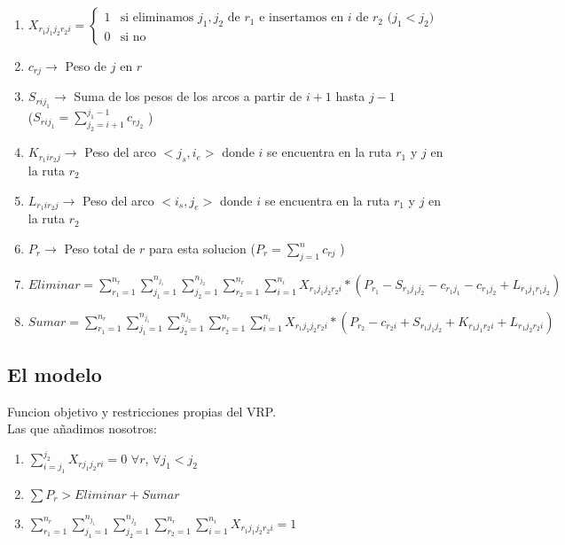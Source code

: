 \documentclass{article}
\begin{document}
\begin{enumerate}
\item
$
 X_{r_1 j_1 j_2 r_2 i}= 
\begin{cases}  
    1 & \text{si eliminamos $j_1,j_2$ de $r_1$ e insertamos en $i$ de $r_2$ ($j_1< j_2$) }\\
    0 & \text{si no } 
\end{cases}
$
\item{$c_{rj}\rightarrow$ Peso de $j$ en $r$}

\item{$S_{rij_1}\rightarrow$ Suma de los pesos de los arcos a partir de $i+1$ hasta $j-1$}\\
($S_{rij_1}=\sum\limits_{j_2=i+1}^{j_1-1} c_{rj_2}$ )

\item{$K_{r_1ir_2j}\rightarrow$ Peso del arco $<j_s,i_e>$ donde $i$ se encuentra en la ruta $r_1$ y $j$ en la ruta $r_2$}

\item{$L_{r_1ir_2j}\rightarrow$ Peso del arco $<i_s,j_e>$ donde $i$ se encuentra en la ruta $r_1$ y $j$ en la ruta $r_2$}

\item{$P_r\rightarrow$ Peso total de $r$ para esta solucion ($P_r=\sum\limits_{j=1}^{n} c_{rj}$ ) }

\item{$Eliminar=\sum\limits_{r_1=1}^{n_{r}} \sum\limits_{j_1=1}^{n_{j_1}}\sum\limits_{j_2=1}^{n_{j_2}}\sum\limits_{r_2=1}^{n_{r}}\sum\limits_{i=1}^{n_i} X_{{r_1}{j_1}{j_2}{r_2}{i}}*(P_{r_1}-S_{{r_1}{j_1}{j_2}}-c_{{r_1}{j_1}}-c_{{r_1}{j_2}}+L_{{r_1}{j_1}{r_1}{j_2}})$}

\item{$Sumar=\sum\limits_{r_1=1}^{n_{r}} \sum\limits_{j_1=1}^{n_{j_1}}\sum\limits_{j_2=1}^{n_{j_2}}\sum\limits_{r_2=1}^{n_{r}}\sum\limits_{i=1}^{n_i} X_{{r_1}{j_1}{j_2}{r_2}{i}}*(P_{r_2} - c_{{r_2}{i}} + S_{{r_1}{j_1}{j_2}}+K_{{r_1}{j_1}{r_2}{i}} + L_{{r_1}{j_2}{r_2}{i}}) $}
\end{enumerate}
\subsection{El modelo}
	Funcion objetivo y restricciones propias del VRP.\\
Las que añadimos nosotros:
\begin{enumerate}
\item{$\sum\limits_{i=j_1}^{j_2} X_{rj_1j_2ri}=0$  $ \forall r$, $\forall j_1<j_2 $}
\item{$\sum P_r> Eliminar + Sumar $}
\item{$ \sum\limits_{r_1=1}^{n_{r}} \sum\limits_{j_1=1}^{n_{j_1}}\sum\limits_{j_2=1}^{n_{j_2}}\sum\limits_{r_2=1}^{n_{r}}\sum\limits_{i=1}^{n_i}X_{{r_1}{j_1}{j_2}{r_2}{i}} = 1 $}
\end{enumerate}
\end{document}
